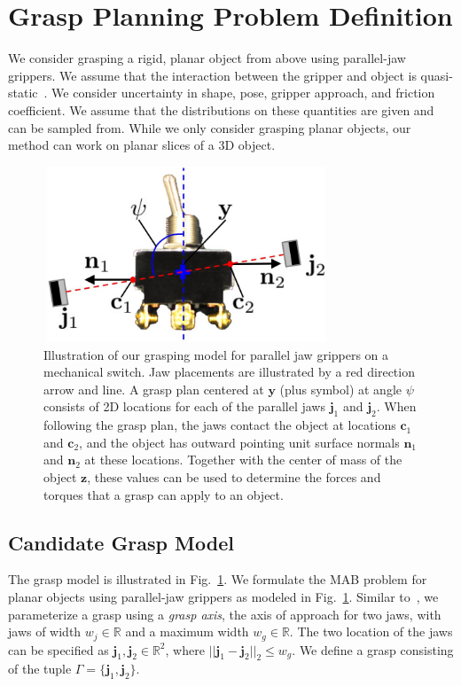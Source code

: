 \documentclass[10pt, conference]{ieeeconf}      %
\newcommand{\bc}{\mathbf{c}}
\newcommand{\bj}{\mathbf{j}}
\newcommand{\bn}{\mathbf{n}}
\newcommand{\by}{\mathbf{y}}
\newcommand{\bz}{\mathbf{z}}
\begin{document}
\section{Grasp Planning Problem Definition}
We consider grasping a rigid, planar object from above using parallel-jaw grippers.
We assume that the interaction between the gripper and object is quasi-static~\cite{kehoe2012estimating, kehoe2012toward}.
We consider uncertainty in shape, pose, gripper approach, and friction coefficient. We assume that the distributions on these quantities are given and can be sampled from.  While we only consider grasping planar objects, our method can work on planar slices of a 3D object. 
\begin{figure}[t!]
\centering
\includegraphics[width = 8.5cm, height = 5.25cm]{figures/bandit_grasp_model.jpg}
\caption{Illustration of our grasping model for parallel jaw grippers on a mechanical switch. Jaw placements are illustrated by a red direction arrow and line. A grasp plan centered at $\by$ (plus symbol) at angle $\psi$ consists of 2D locations for each of the parallel jaws $\bj_1$ and $\bj_2$. When following the grasp plan, the jaws contact the object at locations $\bc_1$ and $\bc_2$, and the object has outward pointing unit surface normals $\bn_1$ and $\bn_2$ at these locations. Together with the center of mass of the object $\bz$, these values can be used to determine the forces and torques that a grasp can apply to an object.}
\vspace*{-2ex}
\label{fig:grasp_model}
\end{figure}

\subsection{Candidate Grasp Model}
The grasp model is illustrated in Fig.~\ref{fig:grasp_model}. We formulate the MAB problem for planar objects using parallel-jaw grippers as modeled in Fig.~\ref{fig:grasp_model}. Similar to~\cite{mahler2015gp}, we parameterize a grasp using a {\it grasp axis}, the axis of approach for two jaws,  with jaws of width $w_j \in \mathbb{R}$ and a maximum width $w_g \in \mathbb{R}$. The two location of the jaws can be specified as $\mathbf{j}_1,\mathbf{j}_2 \in \mathbb{R}^2$, where $||\mathbf{j}_1 - \mathbf{j}_2||_2 \leq w_g$. We define a grasp consisting of the tuple $\Gamma = \lbrace \mathbf{j}_1, \mathbf{j}_2 \rbrace$. 
\end{document}
